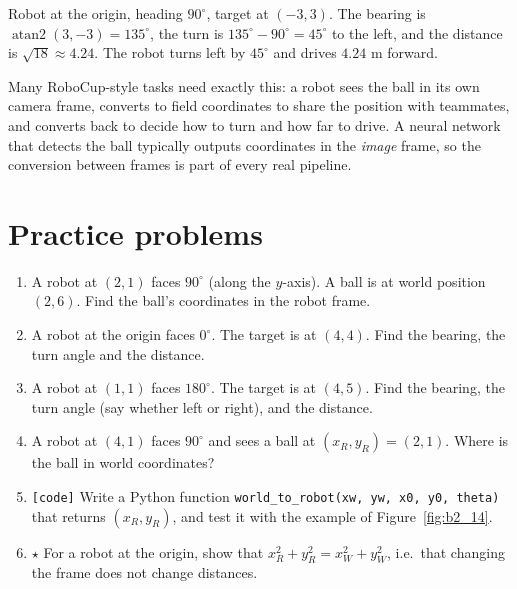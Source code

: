 \begin{example}
Robot at the origin, heading $90^\circ$, target at $(-3,3)$. The bearing is $\operatorname{atan2}(3,-3)=135^\circ$, the turn is $135^\circ-90^\circ=45^\circ$ to the left, and the distance is $\sqrt{18}\approx4.24$. The robot turns left by $45^\circ$ and drives $4.24$ m forward.
\end{example}

\begin{aibox}
Many RoboCup-style tasks need exactly this: a robot sees the ball in its own camera frame, converts to field coordinates to share the position with teammates, and converts back to decide how to turn and how far to drive. A neural network that detects the ball typically outputs coordinates in the \emph{image} frame, so the conversion between frames is part of every real pipeline.
\end{aibox}

\section*{Practice problems}
\begin{enumerate}[label=\textbf{\thechapter.\arabic*}]
  \item A robot at $(2,1)$ faces $90^\circ$ (along the $y$-axis). A ball is at world position $(2,6)$. Find the ball's coordinates in the robot frame.
  \item A robot at the origin faces $0^\circ$. The target is at $(4,4)$. Find the bearing, the turn angle and the distance.
  \item A robot at $(1,1)$ faces $180^\circ$. The target is at $(4,5)$. Find the bearing, the turn angle (say whether left or right), and the distance.
  \item A robot at $(4,1)$ faces $90^\circ$ and sees a ball at $(x_R,y_R)=(2,1)$. Where is the ball in world coordinates?
  \item \texttt{[code]} Write a Python function \texttt{world\_to\_robot(xw, yw, x0, y0, theta)} that returns $(x_R,y_R)$, and test it with the example of Figure~\ref{fig:b2_14}.
  \item $\star$ For a robot at the origin, show that $x_R^2+y_R^2=x_W^2+y_W^2$, i.e.\ that changing the frame does not change distances.
\end{enumerate}

\newpage
